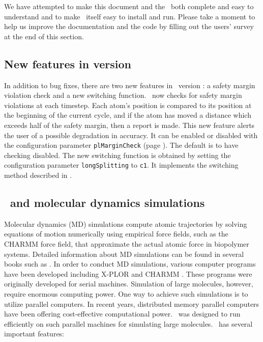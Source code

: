 We have attempted to make this document and the \PG\ both
complete and easy to understand and to make \NAMD\ itself
easy to install and run.  Please take a moment to help us improve
the documentation and the code by filling out the users' survey
at the end of this section.

\subsection{New features in version \NAMDVER}

In addition to bug fixes, there are two new features in \NAMD\ version
\NAMDVER:  a safety margin violation check and a new switching function.
\prettypar
\NAMD\ now checks for safety margin violations
at each timestep.  Each atom's position is
compared to its position at the beginning of the current
cycle, and if the atom has moved a distance which
exceeds half of the safety margin, then a report is made.
This new feature alerts the user of a possible degradation in accuracy.
It can be enabled or disabled with
the configuration parameter \verb!plMarginCheck!
(page \pageref{param:margincheck}).  The default is to have checking disabled.
\prettypar
The new switching function is obtained by setting the configuration
parameter \verb!longSplitting! to \verb!c1!.  It implements the
switching method described in .

\subsection{\NAMD\ and molecular dynamics simulations}

Molecular dynamics (MD) simulations compute atomic trajectories by solving
equations of motion numerically using empirical force fields, such as the 
CHARMM force field, that approximate the actual atomic force in 
biopolymer systems. Detailed information about MD simulations can be found in
several books such as 
. 
In order to conduct MD simulations, various computer programs have been 
developed including
X-PLOR  and 
CHARMM .
These programs were originally developed for serial machines. 
Simulation of large molecules, however, require enormous computing power. 
One way to achieve such simulations is to utilize parallel computers. In recent 
years, distributed memory parallel computers have been offering
cost-effective computational power.  \NAMD\ was designed to run efficiently
on such parallel 
machines for simulating large molecules. 
\prettypar
\NAMD\ has several important features: 

